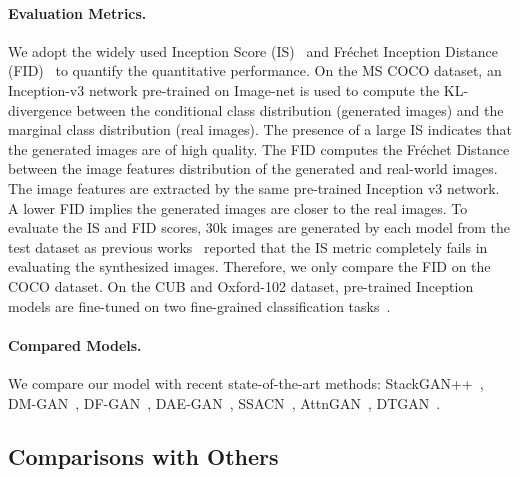 \documentclass{article}
\begin{document}
	\paragraph{Evaluation Metrics.}
	We adopt the widely used Inception Score (IS)~\cite{DBLP:conf/nips/SalimansGZCRCC16} and Fr\'{e}chet Inception Distance (FID)~\cite{DBLP:conf/nips/HeuselRUNH17} to quantify the quantitative performance. On the MS COCO dataset, an Inception-v3 network pre-trained on Image-net is used to compute the KL-divergence between the conditional class distribution (generated images) and the marginal class distribution (real images). The presence of a large IS indicates that the generated images are of high quality. The FID computes the Fr\'{e}chet Distance between the image features distribution of the generated and real-world images. The image features are extracted by the same pre-trained Inception v3 network. A lower FID implies the generated images are closer to the real images. To evaluate the IS and FID scores, 30k images are generated by each model from the test dataset as previous works~\cite{DBLP:journals/corr/abs-2104-00567,DBLP:journals/corr/abs-2008-05865,DBLP:conf/cvpr/LiZZHHLG19,DBLP:conf/ijcnn/ZhangS21} reported that the IS metric completely fails in evaluating the synthesized images. Therefore, we only compare the FID on the COCO dataset. On the CUB and Oxford-102 dataset, pre-trained Inception models are fine-tuned on two fine-grained classification tasks~\cite{DBLP:journals/pami/ZhangXLZWHM19}.
    
	\paragraph{Compared Models.} We compare our model with recent state-of-the-art methods: StackGAN++~\cite{DBLP:journals/pami/ZhangXLZWHM19}, DM-GAN~\cite{DBLP:conf/cvpr/ZhuP0019}, DF-GAN~\cite{DBLP:journals/corr/abs-2008-05865}, DAE-GAN~\cite{DBLP:journals/corr/abs-2108-12141}, SSACN~\cite{DBLP:journals/corr/abs-2104-00567}, AttnGAN~\cite{DBLP:conf/cvpr/XuZHZGH018},
	DTGAN~\cite{DBLP:conf/ijcnn/ZhangS21}.
	\subsection{Comparisons with Others}
\end{document}
